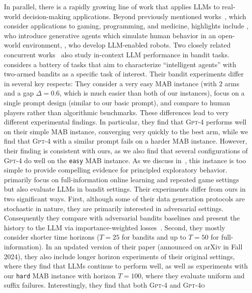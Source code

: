 \documentclass[11pt]{article}
\newcommand{\gptfour}{\textsc{Gpt-4}\xspace}
\newcommand{\gptfouro}{\textsc{Gpt-4o}\xspace}
\newcommand{\easy}{\texttt{easy}\xspace}
\newcommand{\hard}{\texttt{hard}\xspace}
\newcommand{\xhdr}[1]{\vspace{2mm} \noindent{\bf #1}}
\begin{document}
In parallel, there is a rapidly growing line of work that applies LLMs to real-world decision-making applications. Beyond previously mentioned works~\citep{shinn2023reflexion,wang2023voyager,lee2023ai}, which consider applications to gaming, programming, and medicine, highlights include \citet{park2023generative}, who introduce generative agents which simulate human behavior in an open-world environment, \citet{ahn2022can,xu2023creative}, who develop LLM-enabled robots.
\xhdr{Concurrent work.}
Two closely related concurrent works~\citep{wu2024smartplay,park2024llm} also study in-context LLM performance in bandit tasks.
\citet{wu2024smartplay} considers a battery of tasks that aim to characterize ``intelligent agents'' with two-armed bandits as a specific task of interest.
Their bandit experiments differ in several key respects: They consider a very easy MAB instance (with $2$ arms and a gap $\Delta=0.6$, which is much easier than both of our instances), focus on a single prompt design (similar to our basic prompt), and compare to human players rather than algorithmic benchmarks. These differences lead to very different experimental findings. In particular, they find that \gptfour performs well on their simple MAB instance, converging very quickly to the best arm, while we find that \gptfour with a similar prompt fails on a harder MAB instance. However, their finding is consistent with ours, as we also find that several configurations of \gptfour do well on the \easy MAB instance. As we discuss in~, this instance is too simple to provide compelling evidence for principled exploratory behavior.
\citet{park2024llm} primarily focus on full-information online
learning and repeated game settings but also evaluate LLMs in bandit
settings. Their experiments differ from ours in two significant
ways. First, although some of their data generation protocols are
stochastic in nature, they are primarily interested in adversarial
settings. Consequently they compare with adversarial bandits baselines
and present the history to the LLM via importance-weighted
losses~\citep{bandits-exp3}. Second, they mostly consider shorter time
horizons ($T = 25$ for bandits and up to $T = 50$ for
full-information). In an updated version of their paper (announced on
arXiv in Fall 2024), they also include longer horizon experiments of
their original settings, where they find that LLMs continue to perform
well, as well as experiments with our \hard MAB instance with horizon
$T=100$, where they evaluate uniform and suffix
failures. Interestingly, they find that both \gptfour and \gptfouro
\end{document}
